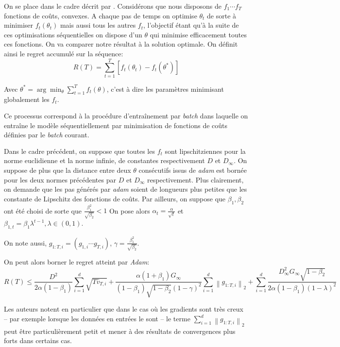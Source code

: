 \documentclass[fleqn,11pt, titlepage, french]{article}
\begin{document}
	On se place dans le cadre décrit par \cite{zinka}. Considérons que nous disposons de $f_1 \cdots f_T$ fonctions de coûts, convexes. A chaque pas de temps on optimise $\theta_t$ de sorte à minimiser $f_t(\theta_t)$ mais aussi tous les autres $f_t$, l'objectif étant qu'à la suite de ces optimisations séquentielles on dispose d'un $\theta$ qui minimise efficacement toutes ces fonctions.  On va comparer notre résultat à la solution optimale. On définit ainsi le regret accumulé sur la séquence:
	\[R(T)=\sum_{t=1}^{T}\left[f_{t}\left(\theta_{t}\right)-f_{t}\left(\theta^{*}\right)\right]\]
	
	Avec $\theta^* = \arg\min_{\theta} \sum_{t=1}^T f_t(\theta)$, c'est à dire les paramètres minimisant globalement les $f_t$.
	
	Ce processus correspond à la procédure d'entraînement par \emph{batch} dans laquelle on entraîne le modèle séquentiellement par minimisation de fonctions de coûts définies par le \emph{batch} courant.
	
	Dans le cadre précédent, on suppose que toutes les $f_t$ sont lipschitziennes pour la norme euclidienne et la norme infinie, de constantes respectivement $D$ et $D_\infty$. On suppose de plus que la distance entre deux $\theta$ consécutifs issus de \emph{adam} est bornée pour les deux normes précédentes par $D$ et $D_\infty$ respectivement. Plus clairement, on demande que les pas générés par \emph{adam} soient de longueurs plus petites que les constante de Lipschitz des fonctions de coûts. Par ailleurs, on suppose que $\beta_{1}, \beta_{2}$ ont été choisi de sorte que $\frac{\beta_{1}^{2}}{\sqrt{\beta_{2}}}<1$
	On pose alors $\alpha_{t}=\frac{\alpha}{\sqrt{t}}$ et $ \beta_{1, t}=\beta_{1} \lambda^{t-1}, \lambda \in(0,1)$. 
	
	On note aussi, $g_{1:T, i} = (g_{1,i} \cdots g_{T,i})$, $\gamma = \frac{\beta_1^2}{\sqrt{\beta_2}}$.
	
	On peut alors borner le regret atteint par \emph{Adam}:
	\[R(T) \leq \frac{D^{2}}{2 \alpha\left(1-\beta_{1}\right)} \sum_{i=1}^{d} \sqrt{T \widehat{v}_{T, i}}+\frac{\alpha\left(1+\beta_{1}\right) G_{\infty}}{\left(1-\beta_{1}\right) \sqrt{1-\beta_{2}}(1-\gamma)^{2}} \sum_{i=1}^{d}\left\|g_{1: T, i}\right\|_{2}+\sum_{i=1}^{d} \frac{D_{\infty}^{2} G_{\infty} \sqrt{1-\beta_{2}}}{2 \alpha\left(1-\beta_{1}\right)(1-\lambda)^{2}}\]
	
	Les auteurs notent en particulier que dans le cas où les gradients sont très creux -- par exemple lorsque les données en entrées le sont -- le terme $\sum_{i=1}^{d}\left\|g_{1: T, i}\right\|_{2}$ peut être particulièrement petit et mener à des résultats de convergences plus forts dans certains cas.
	
\end{document}
